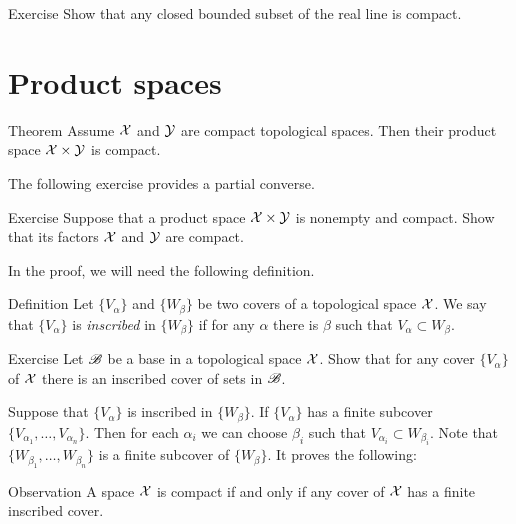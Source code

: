 \begin{thm}{Exercise}\label{ex:closed-bounded=compact}
Show that any closed bounded subset of the real line is compact.
\end{thm}

 
\section{Product spaces}

\begin{thm}{Theorem}\label{thm:compact-product}
Assume $\mathcal{X}$ and $\mathcal{Y}$ are compact topological spaces.
Then their product space $\mathcal{X}\times\mathcal{Y}$ is compact.
\end{thm}

The following exercise provides a partial converse.

\begin{thm}{Exercise}\label{ex:compact-product}
Suppose that a product space $\mathcal{X}\times\mathcal{Y}$ is nonempty and compact.
Show that its factors $\mathcal{X}$ and $\mathcal{Y}$ are compact.
\end{thm} 

In the proof, we will need the following definition.

\begin{thm}{Definition}
Let $\{V_\alpha\}$ and $\{W_\beta\}$ be two covers of a topological space $\mathcal{X}$.
We say that $\{V_\alpha\}$ is \emph{inscribed} in $\{W_\beta\}$ if for any $\alpha$ there is $\beta$ such that $V_\alpha\subset W_\beta$.
\end{thm}

\begin{thm}{Exercise}\label{ex:inscribed-cover-base}
Let $\mathscr{B}$ be a base in a topological space $\mathcal{X}$.
Show that for any cover $\{V_\alpha\}$ of $\mathcal{X}$ there is an inscribed cover of sets in $\mathscr{B}$.
\end{thm}

Suppose that $\{V_\alpha\}$ is inscribed in $\{W_\beta\}$.
If $\{V_\alpha\}$ has a finite subcover $\{V_{\alpha_1},\dots,V_{\alpha_n}\}$.
Then for each $\alpha_i$ we can choose $\beta_i$ such that $V_{\alpha_i}\subset  W_{\beta_i}$.
Note that $\{W_{\beta_1},\dots,W_{\beta_n}\}$ is a finite subcover of $\{W_\beta\}$.
It proves the following:

\begin{thm}{Observation}\label{obs:inscribed-cover}
A space $\mathcal{X}$ is compact if and only if any cover of $\mathcal{X}$ has a finite inscribed cover. 
\end{thm}

